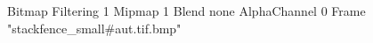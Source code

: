 {Bitmap
	{Filtering 1}
	{Mipmap 1}
	{Blend none}
	{AlphaChannel 0}
	{Frame "stackfence_small#aut.tif.bmp"}
}

